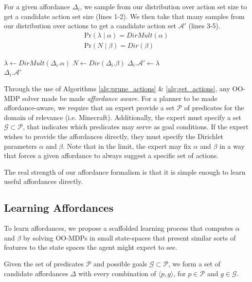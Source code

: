 \documentclass[conference]{IEEEtran}
\begin{document}
For a given affordance $\Delta_i$, we sample from our distribution over action set size to get a candidate action set size (lines 1-2). We then
take that many samples from our distribution over actions to get a candidate action set $\mathcal{A}'$ (lines 3-5).
\begin{align}
\text{Pr}(\lambda \mid \alpha) = DirMult(\alpha) \\
\text{Pr}(N \mid \beta) = Dir(\beta)
\end{align}

\begin{algorithm}
  \caption{$\Delta_i.getActions(s)$}
  \begin{algorithmic}[1]
    \State $\lambda \leftarrow DirMult(\Delta_i.\alpha)$
    \State $N \leftarrow Dir(\Delta_i.\beta)$
    \State $\Delta_i.\mathcal{A}' \leftarrow \lambda$
    \EndFor \\
    \Return $\Delta_i.\mathcal{A}'$
  \end{algorithmic}
  \label{alg:get_actions}
\end{algorithm}

Through the use of Algorithms \ref{alg:prune_actions} \& \ref{alg:get_actions}, any OO-MDP solver made be made
{\it affordance aware}. For a planner to be made affordance-aware, we require that an expert provide a set $\mathcal{P}$ of predicates
for the domain of relevance (i.e. Minecraft). Additionally, the expert must specify a set
$\mathcal{G} \subset \mathcal{P}$, that indicates which predicates may serve as goal conditions. If the expert wishes
to provide the affordances directly, they must specify the Dirichlet parameters $\alpha$ and $\beta$. Note that
in the limit, the expert may fix $\alpha$ and $\beta$ in a way that forces a given
affordance to always suggest a specific set of actions.

The real strength of our affordance formalism is that it is simple enough to learn useful affordances directly.

\subsection{Learning Affordances}

To learn affordances, we propose a scaffolded learning process that computes $\alpha$ and $\beta$ by solving OO-MDPs in small state-spaces that present similar sorts of features to the state spaces the agent might expect to see.

Given the set of predicates $\mathcal{P}$ and possible goals $\mathcal{G} \subset \mathcal{P}$, we form a set of candidate affordances $\Delta$ with every combination of $\langle p, g \rangle$, for $p \in \mathcal{P}$ and $g \in \mathcal{G}$.
\end{document}
